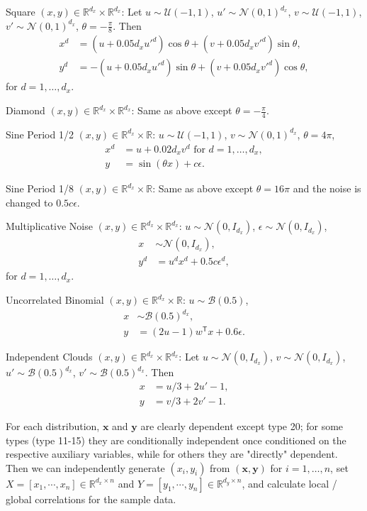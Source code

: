 \documentclass[11pt]{article}
\providecommand{\mb}[1]{\boldsymbol{#1}}
\providecommand{\mc}[1]{\mathcal{#1}}
\newcommand{\Real}{\mathbb{R}}
\newcommand{\T}{^{\ensuremath{\mathsf{T}}}}           %
\begin{document}
\begin{compactenum}
\item Square $(x,y) \in \Real^{d_{x}} \times \Real^{d_{x}}$: Let $u \sim \mc{U}(-1,1)$, $u' \sim \mc{N}(0,1)^{d_{x}}$, $v \sim \mc{U}(-1,1)$, $v' \sim \mc{N}(0,1)^{d_{x}}$, $\theta=-\frac{\pi}{8}$. Then
\begin{align*}
x^{d}&=(u+0.05 d_{x}u'^{d}) \cos\theta + (v+0.05 d_{x}v'^{d}) \sin\theta,\\
y^{d}&=-(u+0.05 d_{x}u'^{d}) \sin\theta + (v+0.05 d_{x}v'^{d}) \cos\theta,
\end{align*}
for $d=1,\ldots,d_{x}$.
\item Diamond $(x,y) \in \Real^{d_{x}} \times \Real^{d_{x}}$: Same as above except $\theta=-\frac{\pi}{4}$.
\item Sine Period 1/2 $(x,y) \in \Real^{d_{x}} \times \Real$: $u \sim \mc{U}(-1,1)$, $v \sim \mc{N}(0,1)^{d_{x}}$, $\theta=4\pi$,
\begin{align*}
x^{d}&=u+0.02 d_{x} v^{d} \mbox{ for $d=1,\ldots,d_{x}$}, \\
y&=\sin ( \theta x )+c\epsilon.
\end{align*}
\item Sine Period 1/8 $(x,y) \in \Real^{d_{x}} \times \Real$: Same as above except $\theta=16\pi$ and the noise is changed to $0.5c\epsilon$.
\item Multiplicative Noise $(x,y) \in \Real^{d_{x}} \times \Real^{d_{x}}$: $u \sim \mc{N}(0, I_{d_{x}})$, $\epsilon \sim \mc{N}(0, I_{d_{x}})$,
\begin{align*}
x &\sim \mc{N}(0, I_{d_{x}}),\\
y^{d}&=u^{d}x^{d}+0.5c\epsilon^{d},
\end{align*}
for $d=1,\ldots,d_{x}$.
\item Uncorrelated Binomial $(x,y) \in \Real^{d_{x}} \times \Real$: $u \sim \mc{B}(0.5)$,
\begin{align*}
x &\sim \mc{B}(0.5)^{d_{x}},\\ 
y&=(2u-1)w\T x+0.6\epsilon.
\end{align*}
\item Independent Clouds $(x,y) \in \Real^{d_{x}} \times \Real^{d_{x}}$: Let $u \sim \mc{N}(0,I_{d_{x}})$, $v \sim \mc{N}(0,I_{d_{x}})$, $u' \sim \mc{B}(0.5)^{d_{x}}$, $v' \sim \mc{B}(0.5)^{d_{x}}$. Then
\begin{align*}
x&=u/3+2u'-1,\\
y&=v/3+2v'-1.
\end{align*}
\end{compactenum}

For each distribution, $\mb{x}$ and $\mb{y}$ are clearly dependent except type 20; for some types (type 11-15) they are conditionally independent once conditioned on the respective auxiliary variables, while for others they are "directly" dependent. Then we can independently generate $(x_{i},y_{i})$ from $(\mb{x},\mb{y})$ for $i=1,\ldots,n$, set $X=[x_{1},\cdots, x_{n}] \in \Real^{d_{x} \times n}$ and $Y=[y_{1},\cdots, y_{n}] \in \Real^{d_{y} \times n}$, and calculate local / global correlations for the sample data.
\end{document}
